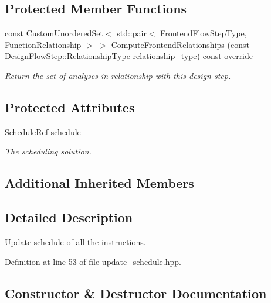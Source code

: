 \subsection*{Protected Member Functions}
\begin{DoxyCompactItemize}
\item 
const \hyperlink{classCustomUnorderedSet}{Custom\+Unordered\+Set}$<$ std\+::pair$<$ \hyperlink{frontend__flow__step_8hpp_afeb3716c693d2b2e4ed3e6d04c3b63bb}{Frontend\+Flow\+Step\+Type}, \hyperlink{classFrontendFlowStep_af7cf30f2023e5b99e637dc2058289ab0}{Function\+Relationship} $>$ $>$ \hyperlink{classUpdateSchedule_a52731ffff5c21bc62273d3dd77766eb4}{Compute\+Frontend\+Relationships} (const \hyperlink{classDesignFlowStep_a723a3baf19ff2ceb77bc13e099d0b1b7}{Design\+Flow\+Step\+::\+Relationship\+Type} relationship\+\_\+type) const override
\begin{DoxyCompactList}\small\item\em Return the set of analyses in relationship with this design step. \end{DoxyCompactList}\end{DoxyCompactItemize}
\subsection*{Protected Attributes}
\begin{DoxyCompactItemize}
\item 
\hyperlink{schedule_8hpp_af67f402958b3b52a1ec5cc4ce08ae3b9}{Schedule\+Ref} \hyperlink{classUpdateSchedule_a5f2155d3a69907ff51bec7b73da62055}{schedule}
\begin{DoxyCompactList}\small\item\em The scheduling solution. \end{DoxyCompactList}\end{DoxyCompactItemize}
\subsection*{Additional Inherited Members}


\subsection{Detailed Description}
Update schedule of all the instructions. 

Definition at line 53 of file update\+\_\+schedule.\+hpp.



\subsection{Constructor \& Destructor Documentation}
\mbox{\label{classUpdateSchedule_a2bf718469aa4f8071f3ae59c0faff58f}} 
